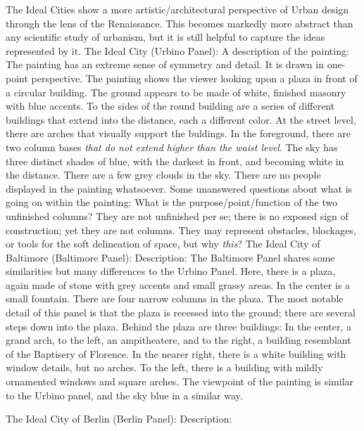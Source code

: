 \documentclass{article}
\begin{document}
        \begin{outline}
            \1 The Ideal Cities show a more artistic/architectural perspective of Urban design through the lens of the Renaissance. 
            \1 This becomes markedly more abstract than any scientific study of urbanism, but it is still helpful to capture the ideas represented by it. 
            \1 The Ideal City (Urbino Panel):
                \2 A description of the painting: The painting has an extreme sense of symmetry and detail. It is drawn in one-point perspective. The painting shows the viewer looking upon a plaza in front of a circular building. The ground appears to be made of white, finished masonry with blue accents. To the sides of the round building are a series of different buildings that extend into the distance, each a different color. At the street level, there are arches that visually support the buldings. In the foreground, there are two column bases \textit{that do not extend higher than the waist level}. The sky has three distinct shades of blue, with the darkest in front, and becoming white in the distance. There are a few grey clouds in the sky. There are no people displayed in the painting whatsoever. 
                \2 Some unanswered questions about what is going on within the painting: 
                    \3 What is the purpose/point/function of the two unfinished columns? They are not unfinished per se; there is no exposed sign of construction; yet they are not columns. They may represent obstacles, blockages, or tools for the soft delineation of space, but why \textit{this}?
                    \3 
                \2 
            \1 The Ideal City of Baltimore (Baltimore Panel):
                \2 Description: The Baltimore Panel shares some similarities but many differences to the Urbino Panel. Here, there is a plaza, again made of stone with grey accents and small grassy areas. In the center is a small fountain. There are four narrow columns in the plaza. The most notable detail of this panel is that the plaza is recessed into the ground; there are several steps down into the plaza. Behind the plaza are three buildings: In the center, a grand arch, to the left, an ampitheatere, and to the right, a building resemblant of the Baptisery of Florence. In the nearer right, there is a white building with window details, but no arches. To the left, there is a building with mildly ornamented windows and square arches. The viewpoint of the painting is similar to the Urbino panel, and the sky blue in a similar way. 

            \1 The Ideal City of Berlin (Berlin Panel):
                \2 Description:
        \end{outline}
\end{document}

